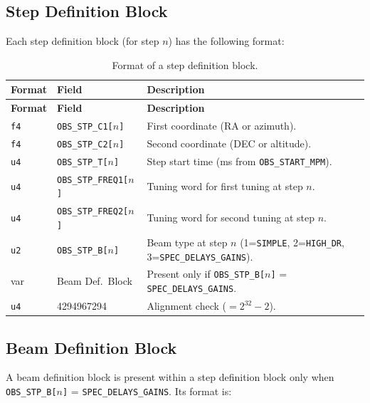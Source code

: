 \subsection{Step Definition Block}

Each step definition block (for step $n$) has the following format:

\begin{longtable}{|l|l|p{8cm}|}
\caption{Format of a step definition block.}
\label{tab:step-format} \\
\hline
\textbf{Format} & \textbf{Field} & \textbf{Description} \\
\hline
\endfirsthead

\hline
\textbf{Format} & \textbf{Field} & \textbf{Description} \\
\hline
\endhead

\hline
\endfoot

\texttt{f4} & \texttt{OBS\_STP\_C1[$n$]}     & First coordinate (RA or azimuth). \\
\hline
\texttt{f4} & \texttt{OBS\_STP\_C2[$n$]}     & Second coordinate (DEC or altitude). \\
\hline
\texttt{u4} & \texttt{OBS\_STP\_T[$n$]}      & Step start time (ms from \texttt{OBS\_START\_MPM}). \\
\hline
\texttt{u4} & \texttt{OBS\_STP\_FREQ1[$n$]}  & Tuning word for first tuning at step $n$. \\
\hline
\texttt{u4} & \texttt{OBS\_STP\_FREQ2[$n$]}  & Tuning word for second tuning at step $n$. \\
\hline
\texttt{u2} & \texttt{OBS\_STP\_B[$n$]}      & Beam type at step $n$ (1=\texttt{SIMPLE}, 2=\texttt{HIGH\_DR}, 3=\texttt{SPEC\_DELAYS\_GAINS}). \\
\hline
     var     & Beam Def.\ Block               & Present only if \texttt{OBS\_STP\_B[$n$]} = \texttt{SPEC\_DELAYS\_GAINS}. \\
\hline
\texttt{u4} & 4294967294                      & Alignment check ($= 2^{32}-2$). \\
\hline

\end{longtable}

\subsection{Beam Definition Block}

A beam definition block is present within a step definition block only when \texttt{OBS\_STP\_B[$n$]} = \texttt{SPEC\_DELAYS\_GAINS}.  Its format is:

